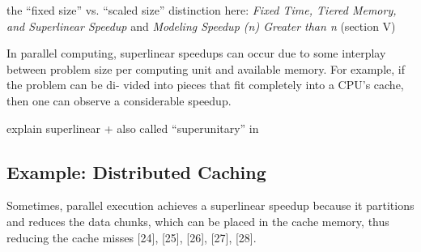 the ``fixed size'' vs. ``scaled size'' distinction here: \emph{Fixed Time, Tiered Memory, and Superlinear Speedup} and \emph{Modeling Speedup (n) Greater than n} (section V)



 In parallel computing, superlinear speedups can occur due to some interplay between
problem size per computing unit and available memory. For example, if the problem can be di-
vided into pieces that fit completely into a CPU’s cache, then one can observe a considerable
speedup.


explain superlinear + also called ``superunitary'' in %



\subsection{Example: Distributed Caching}
\label{sec:backgound-dist-caching}

Sometimes, parallel execution achieves a superlinear
speedup because it partitions and reduces the data chunks,
which can be placed in the cache memory, thus reducing the
cache misses [24], [25], [26], [27], [28].




